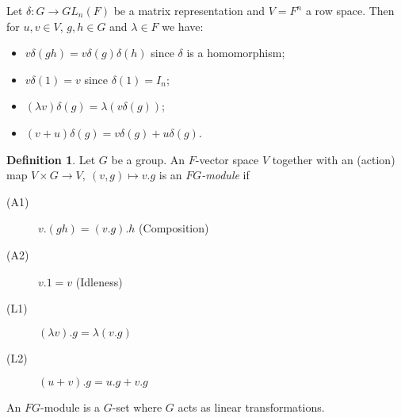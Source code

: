 \documentclass[12pt]{amsart}
\theoremstyle{definition}
\newtheorem{definition}[theorem]{Definition}
\begin{document}
Let $\delta:G\rightarrow GL_n(F)$ be a matrix representation and $V=F^n$ a row space.  Then for $u, v\in V$, $g, h\in G$ and $\lambda\in F$ we have:
\begin{itemize}
\item $v\delta(gh)=v\delta(g)\delta(h)$ since $\delta$ is a homomorphism;
\item $v\delta(1)=v$ since $\delta(1)=I_n$;
\item $(\lambda v)\delta(g)=\lambda(v\delta(g))$;
\item $(v+u)\delta(g)=v\delta(g)+u\delta(g)$.
\end{itemize}

\begin{definition}
Let $G$ be a group.  An $F$-vector space $V$ together with an (action) map $V\times G\rightarrow V,\ (v, g)\mapsto v.g$ is an \emph{$FG$-module} if
\begin{description}
\item[(A1)] $v.(gh)=(v.g).h$ (Composition)
\item[(A2)] $v.1=v$ (Idleness)
\item[(L1)] $(\lambda v).g=\lambda(v.g)$
\item[(L2)] $(u+v).g=u.g+v.g$
\end{description}
\end{definition}

\noindent An $FG$-module is a $G$-set where $G$ acts as linear transformations.\\
\end{document}
